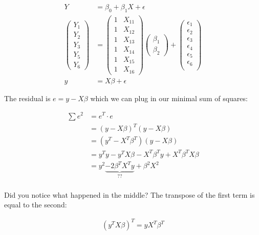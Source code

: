 \documentclass[
]{book}
\begin{document}
\[ \begin{align}
Y &= \beta_0 + \beta_1 X + \epsilon \tag{X is a variable, Y is a variable} \\
\begin{pmatrix} Y_1 \\ Y_2 \\ Y_3 \\ Y_5 \\ Y_6 \end{pmatrix} &= \begin{pmatrix} 1 & X_{11} \\ 1 & X_{12} \\ 1 & X_{13} \\ 1 & X_{14} \\ 1 & X_{15} \\ 1 & X_{16}   \end{pmatrix} \begin{pmatrix} \beta_1 \\ \beta_2 \end{pmatrix} + \begin{pmatrix} \epsilon_1 \\ \epsilon_2 \\ \epsilon_3 \\ \epsilon_4 \\ \epsilon_5 \\ \epsilon_6 \\ \end{pmatrix} \\
y &= X \beta + \epsilon \tag{X is a matrix, y is a vector}
\end{align}\]

The residual is \(e = y - X \beta\) which we can plug in our minimal sum of squares:

\[\begin{align}
    \sum e^2 &= e^T \cdot e \tag{short RSS}\\
    &= (y - X \beta )^T (y - X \beta) \tag{$(A+B)^T = A^T + B^T$}\\
    &= (y^T - X^T \beta^T) (y - X \beta) \\
    &= y^T y - y^T X \beta - X^T \beta^T y + X^T \beta^T X \beta \\
    &= y^2 \underbrace{- 2 \beta^T X^T y}_{??} + \beta^2 X^2  \\
\end{align}\]

Did you notice what happened in the middle? The transpose of the first term is equal to the second:

\[\begin{align}
    (y^T X \beta)^T = y X^T \beta^T
\end{align}\]
\end{document}
